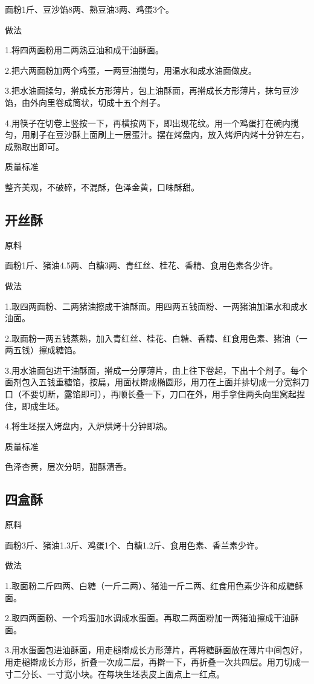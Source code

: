 \documentclass{ctexbook}
\begin{document}
面粉1斤、豆沙馅8两、熟豆油3两、鸡蛋3个。

做法

1.将四两面粉用二两熟豆油和成干油酥面。

2.把六两面粉加两个鸡蛋，一两豆油搅匀，用温水和成水油面做皮。

3.把水油面揉匀，擀成长方形薄片，包上油酥面，再擀成长方形薄片，抹匀豆沙馅，由外向里卷成筒状，切成十五个剂子。

4.用筷子在切卷上竖按一下，再横按两下，即出现花纹。用一个鸡蛋打在碗内搅匀，用刷子在豆沙酥上面刷上一层蛋汁。摆在烤盘内，放入烤炉内烤十分钟左右，成熟取出即可。

质量标准

整齐美观，不破碎，不混酥，色泽金黄，口味酥甜。
\subsection{开丝酥}
原料

面粉1斤、猪油4.5两、白糖3两、青红丝、桂花、香精、食用色素各少许。

做法

1.取四两面粉、二两猪油擦成干油酥面。用四两五钱面粉、一两猪油加温水和成水油面。

2.取面粉一两五钱蒸熟，加入青红丝、桂花、白糖、香精、红食用色素、猪油（一两五钱）擦成糖馅。

3.用水油面包进干油酥面，擀成一分厚薄片，由上往下卷起，下出十个剂子。每个面剂包入五钱重糖馅，按扁，用面杖擀成椭圆形，用刀在上面并排切成一分宽斜刀口（不要切断，露馅即可），再顺长叠一下，刀口在外，用手拿住两头向里窝起捏住，即成生坯。

4.将生坯摆入烤盘内，入炉烘烤十分钟即熟。

质量标准

色泽杏黄，层次分明，甜酥清香。
\subsection{四盒酥}
原料

面粉3斤、猪油1.3斤、鸡蛋1个、白糖1.2斤、食用色素、香兰素少许。

做法

1.取面粉二斤四两、白糖（一斤二两）、猪油一斤二两、红食用色素少许和成糖稣面。

2.取四两面粉、一个鸡蛋加水调成水蛋面。再取二两面粉加一两猪油擦成干油酥面。

3.用水蛋面包进油酥面，用走槌擀成长方形薄片，再将糖酥面放在薄片中间包好，用走槌擀成长方形，折叠一次成二层，再擀一下，再折叠一次共四层。用刀切成一寸二分长、一寸宽小块。在每块生坯表皮上面点上一红点。
\end{document}
